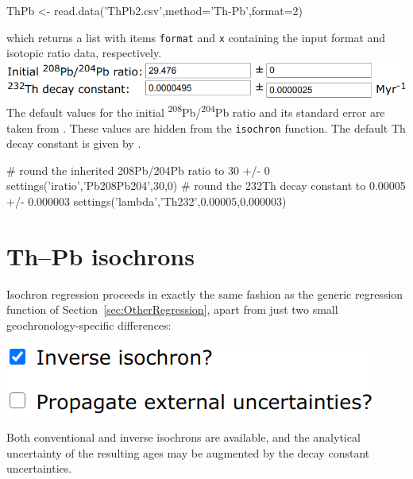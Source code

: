 \begin{refsection}
\begin{console}
ThPb <- read.data('ThPb2.csv',method='Th-Pb',format=2)
\end{console}

\noindent which returns a list with items \texttt{format} and
\texttt{x} containing the input format and isotopic ratio data,
respectively.\\

\noindent\includegraphics[width=.7\linewidth]{../figures/ThPbLambda.png}\\
\noindent The default values for the initial
\textsuperscript{208}Pb/\textsuperscript{204}Pb ratio and its standard
error are taken from \citet{stacey1975}. These values are hidden from
the \texttt{isochron} function. The default Th decay constant is given
by \citet{leroux1963}.

\begin{script}
# round the inherited 208Pb/204Pb ratio to 30 +/- 0
settings('iratio','Pb208Pb204',30,0) 
# round the 232Th decay constant to 0.00005 +/- 0.000003
settings('lambda','Th232',0.00005,0.000003) 
\end{script}

\section{Th--Pb isochrons}\label{sec:ThPb-isochrons-R}

Isochron regression proceeds in exactly the same fashion as the
generic regression function of Section~\ref{sec:OtherRegression},
apart from just two small geochronology-specific differences:\\

\noindent\begin{minipage}[t]{.35\linewidth}
\strut\vspace*{-\baselineskip}\newline
\includegraphics[width=\linewidth]{../figures/ThPbInverseExterr.png}
\end{minipage}
\begin{minipage}[t]{.65\linewidth}
Both conventional and inverse isochrons are available, and the
analytical uncertainty of the resulting ages may be augmented by the
decay constant uncertainties.\\
\end{minipage}


\end{refsection}
